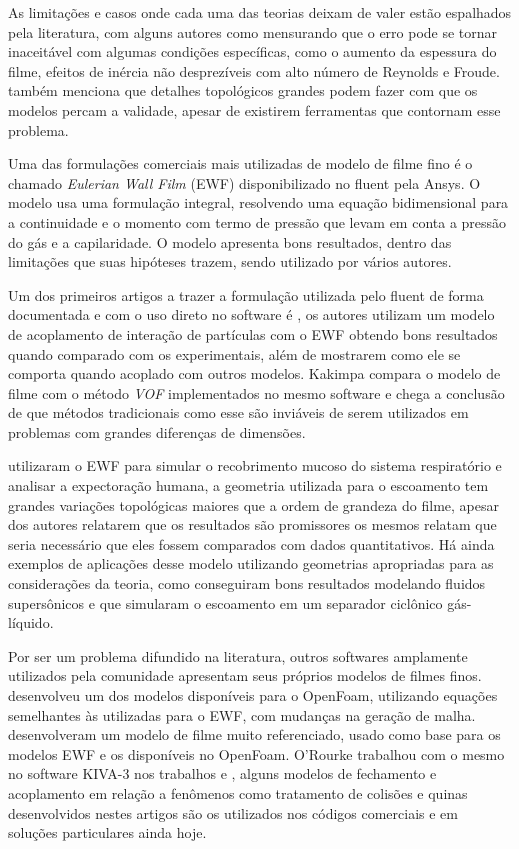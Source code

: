 As limitações e casos onde cada uma das teorias deixam de valer estão espalhados pela literatura, com alguns autores como \citet{Wray2017} mensurando que o erro pode se tornar inaceitável com algumas condições específicas, como o aumento da espessura do filme, efeitos de inércia não desprezíveis com alto número de Reynolds e Froude. \citet{Craster2009} também menciona que detalhes topológicos grandes podem fazer com que os modelos percam a validade, apesar de existirem ferramentas que contornam esse problema.

Uma das formulações comerciais mais utilizadas de modelo de filme fino é o chamado \textit{Eulerian Wall Film} (EWF) disponibilizado no fluent pela Ansys. O modelo usa uma formulação integral, resolvendo uma equação bidimensional para a continuidade e o momento com termo de pressão que levam em conta a pressão do gás e a capilaridade. O modelo apresenta bons resultados, dentro das limitações que suas hipóteses trazem, sendo utilizado por vários autores.

Um dos primeiros artigos a trazer a formulação utilizada pelo fluent de forma documentada e com o uso direto no software é \citet{Ingle2014}, os autores utilizam um modelo de acoplamento de interação de partículas com o EWF obtendo bons resultados quando comparado com os experimentais, além de mostrarem como ele se comporta quando acoplado com outros modelos. Kakimpa \citeyearpar{Kakimpa2015,Kakimpa2016} compara o modelo de filme com o método \textit{VOF} implementados no mesmo software e chega a conclusão de que métodos tradicionais como esse são inviáveis de serem utilizados em problemas com grandes diferenças de dimensões. 

\citet{Paz2017} utilizaram o EWF para simular o recobrimento mucoso do sistema respiratório e analisar a expectoração humana, a geometria utilizada para o escoamento tem grandes variações topológicas maiores que a ordem de grandeza do filme, apesar dos autores relatarem que os resultados são promissores os mesmos relatam que seria necessário que eles fossem comparados com dados quantitativos. Há ainda exemplos de aplicações desse modelo utilizando geometrias apropriadas para as considerações da teoria, como \citet{Ding2022} conseguiram bons resultados modelando fluidos supersônicos e \citet{Yue2022} que simularam o escoamento em um separador ciclônico gás-líquido.

Por ser um problema difundido na literatura, outros softwares amplamente utilizados pela comunidade apresentam seus próprios modelos de filmes finos. \citet{Meredith2011} desenvolveu um dos modelos disponíveis para o OpenFoam, utilizando equações semelhantes às utilizadas para o EWF, com mudanças na geração de malha. \citet{Bai1996} desenvolveram um modelo de filme muito referenciado, usado como base para os modelos EWF e os disponíveis no OpenFoam. O'Rourke trabalhou com o mesmo no software KIVA-3 nos trabalhos \citet{ORourke1996} e \citet{ORourke2000}, alguns modelos de fechamento e acoplamento em relação a fenômenos como tratamento de colisões e quinas desenvolvidos nestes artigos são os utilizados nos códigos comerciais e em soluções particulares ainda hoje.



